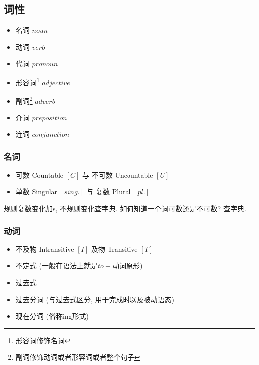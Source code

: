\documentclass[a4paper]{article}
\begin{document}
\subsection{词性}
\begin{itemize}
  \item 名词 $noun$
  \item 动词 $verb$
  \item 代词 $pronoun$
  \item 形容词\footnote{形容词修饰名词} $adjective$
  \item 副词\footnote{副词修饰动词或者形容词或者整个句子} $adverb$
  \item 介词 $preposition$
  \item 连词 $conjunction$
\end{itemize}
\subsubsection{名词}
\begin{itemize}
  \item 可数 Countable $[C]$ 与 不可数 Uncountable $[U]$
  \item 单数 Singular $[sing.]$ 与 复数 Plural $[pl.]$ 
\end{itemize}
规则复数变化加s, 不规则变化查字典. 如何知道一个词可数还是不可数? 查字典. 
\subsubsection{动词}
\begin{itemize}
  \item 不及物 Intransitive $[I]$ 及物 Transitive $[T]$
  \item 不定式 (一般在语法上就是$to+\text{动词原形}$)
  \item 过去式
  \item 过去分词 (与过去式区分, 用于完成时以及被动语态)
  \item 现在分词 (俗称ing形式)
\end{itemize}
\end{document}
